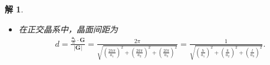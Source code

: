 \documentclass[UTF8,10pt,a4paper]{article}
\theoremstyle{Problem}
\theoremstyle{Solution}
\newtheorem*{sol}{解}
\providecommand{\abs}[1]{\left\lvert#1\right\rvert}
\begin{document}
\begin{sol}
\begin{itemize}
\begin{align*}
        \end{align*}
        晶面间距为
        \begin{align}
            d=\frac{\frac{\bm{a}_1}{h}\cdot\bm{G}}{\abs{\bm{G}}}=\frac{2\pi}{\sqrt{(\frac{2h\pi}{a})^2+\left(\frac{2k\pi}{a}\right)^2+\left(\frac{2l\pi}{a}\right)^2}}=\frac{a}{\sqrt{h^2+k^2+l^2}}.
        \end{align}
        \item[$\triangleright$] 在正交晶系中，晶面间距为
        \begin{align}
            d=\frac{\frac{\bm{a}_1}{h}\cdot\bm{G}}{\abs{\bm{G}}}=\frac{2\pi}{\sqrt{(\frac{2h\pi}{a_1})^2+\left(\frac{2k\pi}{a_2}\right)^2+\left(\frac{2l\pi}{a_3}\right)^2}}=\frac{1}{\sqrt{\left(\frac{h}{a_1}\right)^2+\left(\frac{k}{a_2}\right)^2+\left(\frac{l}{a_3}\right)^2}}.
        \end{align}
    \end{itemize}
\end{sol}
\end{document}
